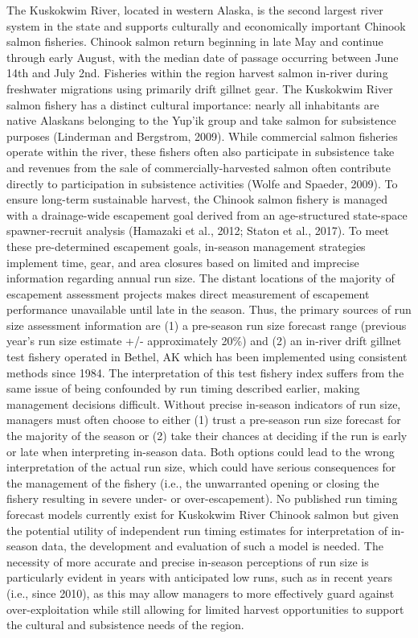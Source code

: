 \documentclass[12pt,]{book}
\theoremstyle{definition}
\theoremstyle{definition}
\theoremstyle{definition}
\theoremstyle{remark}
\begin{document}
The Kuskokwim River, located in western Alaska, is the second largest
river system in the state and supports culturally and economically
important Chinook salmon fisheries. Chinook salmon return beginning in
late May and continue through early August, with the median date of
passage occurring between June 14th and July 2nd. Fisheries within the
region harvest salmon in-river during freshwater migrations using
primarily drift gillnet gear. The Kuskokwim River salmon fishery has a
distinct cultural importance: nearly all inhabitants are native Alaskans
belonging to the Yup'ik group and take salmon for subsistence purposes
(Linderman and Bergstrom, 2009). While commercial salmon fisheries
operate within the river, these fishers often also participate in
subsistence take and revenues from the sale of commercially-harvested
salmon often contribute directly to participation in subsistence
activities (Wolfe and Spaeder, 2009). To ensure long-term sustainable
harvest, the Chinook salmon fishery is managed with a drainage-wide
escapement goal derived from an age-structured state-space
spawner-recruit analysis (Hamazaki et al., 2012; Staton et al., 2017).
To meet these pre-determined escapement goals, in-season management
strategies implement time, gear, and area closures based on limited and
imprecise information regarding annual run size. The distant locations
of the majority of escapement assessment projects makes direct
measurement of escapement performance unavailable until late in the
season. Thus, the primary sources of run size assessment information are
(1) a pre-season run size forecast range (previous year's run size
estimate +/- approximately 20\%) and (2) an in-river drift gillnet test
fishery operated in Bethel, AK which has been implemented using
consistent methods since 1984. The interpretation of this test fishery
index suffers from the same issue of being confounded by run timing
described earlier, making management decisions difficult. Without
precise in-season indicators of run size, managers must often choose to
either (1) trust a pre-season run size forecast for the majority of the
season or (2) take their chances at deciding if the run is early or late
when interpreting in-season data. Both options could lead to the wrong
interpretation of the actual run size, which could have serious
consequences for the management of the fishery (i.e., the unwarranted
opening or closing the fishery resulting in severe under- or
over-escapement). No published run timing forecast models currently
exist for Kuskokwim River Chinook salmon but given the potential utility
of independent run timing estimates for interpretation of in-season
data, the development and evaluation of such a model is needed. The
necessity of more accurate and precise in-season perceptions of run size
is particularly evident in years with anticipated low runs, such as in
recent years (i.e., since 2010), as this may allow managers to more
effectively guard against over-exploitation while still allowing for
limited harvest opportunities to support the cultural and subsistence
needs of the region.
\end{document}
